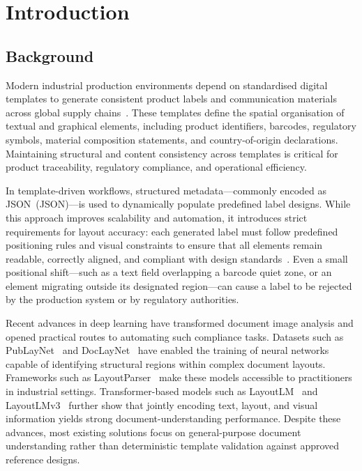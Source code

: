 \chapter{Introduction}
\label{ch:introduction}

\section{Background}
\label{sec:background}

Modern industrial production environments depend on standardised digital templates to
generate consistent product labels and communication materials across global supply
chains~\cite{zhong2019publaynet}. These templates define the spatial organisation of
textual and graphical elements, including product identifiers, barcodes, regulatory symbols,
material composition statements, and country-of-origin declarations. Maintaining structural
and content consistency across templates is critical for product traceability, regulatory
compliance, and operational efficiency.

In template-driven workflows, structured metadata—commonly encoded as
\acl{JSON}~(JSON)—is used to dynamically populate predefined label designs. While this
approach improves scalability and automation, it introduces strict requirements for layout
accuracy: each generated label must follow predefined positioning rules and visual constraints
to ensure that all elements remain readable, correctly aligned, and compliant with design
standards~\cite{li2020docbank}. Even a small positional shift—such as a text field
overlapping a barcode quiet zone, or an element migrating outside its designated region—can
cause a label to be rejected by the production system or by regulatory authorities.

Recent advances in deep learning have transformed document image analysis and opened
practical routes to automating such compliance tasks. Datasets such as
PubLayNet~\cite{zhong2019publaynet} and DocLayNet~\cite{pfitzmann2022doclaynet} have
enabled the training of neural networks capable of identifying structural regions within
complex document layouts. Frameworks such as LayoutParser~\cite{shen2021layoutparser}
make these models accessible to practitioners in industrial settings. Transformer-based
models such as LayoutLM~\cite{xu2020layoutlm} and LayoutLMv3~\cite{huang2022layoutlmv3}
further show that jointly encoding text, layout, and visual information yields strong
document-understanding performance. Despite these advances, most existing solutions focus
on general-purpose document understanding rather than deterministic template validation
against approved reference designs.


